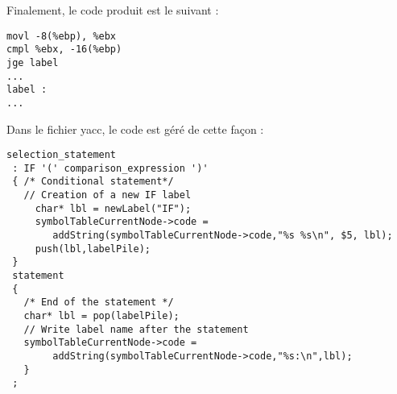 Finalement, le code produit est le suivant :

\begin{verbatim}
movl -8(%ebp), %ebx
cmpl %ebx, -16(%ebp)
jge label
...
label :
...
\end{verbatim}

Dans le fichier yacc, le code est géré de cette façon :

\begin{verbatim}
selection_statement
 : IF '(' comparison_expression ')' 
 { /* Conditional statement*/
   // Creation of a new IF label
     char* lbl = newLabel("IF");
     symbolTableCurrentNode->code = 
     	addString(symbolTableCurrentNode->code,"%s %s\n", $5, lbl);
     push(lbl,labelPile);
 }
 statement
 {
   /* End of the statement */
   char* lbl = pop(labelPile);
   // Write label name after the statement
   symbolTableCurrentNode->code = 
   		addString(symbolTableCurrentNode->code,"%s:\n",lbl);
   }
 ;
\end{verbatim}